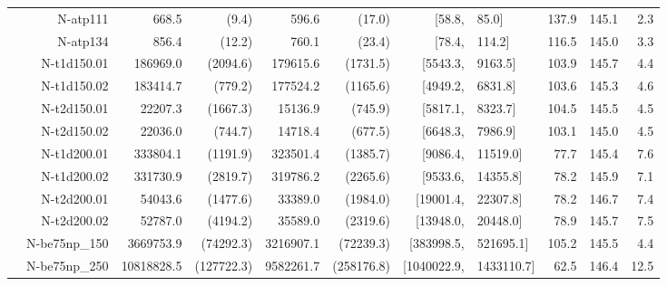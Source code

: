 \documentclass[sigconf,dvipsnames]{acmart}
\begin{document}
\begin{table}[tb]
{\begin{tabular}{r@{\hskip -2ex}*{5}{r}rl@{\hskip -2ex}*{3}{r}}
& N-atp111       & 668.5               & (9.4)              & 596.6              & (17.0)            & [58.8,               & 85.0]               & 137.9        & 145.1 & 2.3  \\
& N-atp134       & 856.4               & (12.2)             & 760.1              & (23.4)            & [78.4,               & 114.2]              & 116.5        & 145.0 & 3.3  \\
& N-t1d150.01    & 186969.0            & (2094.6)           & 179615.6           & (1731.5)          & [5543.3,             & 9163.5]             & 103.9        & 145.7 & 4.4  \\
& N-t1d150.02    & 183414.7            & (779.2)            & 177524.2           & (1165.6)          & [4949.2,             & 6831.8]             & 103.6        & 145.3 & 4.6  \\
& N-t2d150.01    & 22207.3             & (1667.3)           & 15136.9            & (745.9)           & [5817.1,             & 8323.7]             & 104.5        & 145.5 & 4.5  \\
& N-t2d150.02    & 22036.0             & (744.7)            & 14718.4            & (677.5)           & [6648.3,             & 7986.9]             & 103.1        & 145.0 & 4.5  \\
& N-t1d200.01    & 333804.1            & (1191.9)           & 323501.4           & (1385.7)          & [9086.4,             & 11519.0]            & 77.7         & 145.4 & 7.6  \\
& N-t1d200.02    & 331730.9            & (2819.7)           & 319786.2           & (2265.6)          & [9533.6,             & 14355.8]            & 78.2         & 145.9 & 7.1  \\
& N-t2d200.01    & 54043.6             & (1477.6)           & 33389.0            & (1984.0)          & [19001.4,            & 22307.8]            & 78.2         & 146.7 & 7.4  \\
& N-t2d200.02    & 52787.0             & (4194.2)           & 35589.0            & (2319.6)          & [13948.0,            & 20448.0]            & 78.9         & 145.7 & 7.5  \\
& N-be75np\_150  & 3669753.9           & (74292.3)          & 3216907.1          & (72239.3)         & [383998.5,           & 521695.1]           & 105.2        & 145.5 & 4.4  \\
& N-be75np\_250  & 10818828.5          & (127722.3)         & 9582261.7          & (258176.8)        & [1040022.9,          & 1433110.7]          & 62.5         & 146.4 & 12.5 \\

\end{tabular}}
\end{table}
\end{document}
